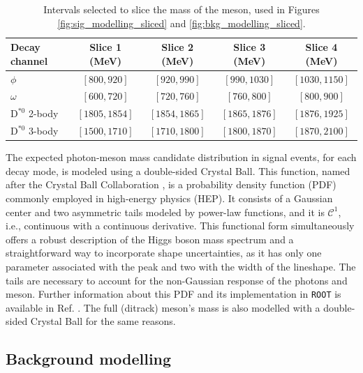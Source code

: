 \begin{table}[!ht]
    \centering
    \begin{tabular}{|l|c|c|c|c|}
        \hline
        \cellcolor{lightgray}Decay channel &\cellcolor{lightgray}Slice 1 (MeV)&\cellcolor{lightgray}Slice 2 (MeV)&\cellcolor{lightgray}Slice 3 (MeV)&\cellcolor{lightgray}Slice 4 (MeV)\\ \hline
        $\phi$                  &$[800, 920]$&$[920, 990]$&$[990, 1030]$&$[1030, 1150]$  \\
        $\omega$                &$[600, 720]$&$[720, 760]$&$[760, 800]$&$[800, 900]$  \\
        $\text{D}^{*0}$ 2-body  &$[1805, 1854]$&$[1854, 1865]$&$[1865, 1876]$&$[1876, 1925]$  \\
        $\text{D}^{*0}$ 3-body  &$[1500, 1710]$&$[1710, 1800]$&$[1800, 1870]$&$[1870, 2100]$  \\
        \hline
        \end{tabular}
    \caption{Intervals selected to slice the mass of the meson, used in Figures \ref{fig:sig_modelling_sliced} and \ref{fig:bkg_modelling_sliced}.}
    \label{tab:slice_values}
\end{table}

The expected photon-meson mass candidate distribution in signal events, for each decay mode, is modeled using a double-sided Crystal Ball. This function, named after the Crystal Ball Collaboration \cite{A2:CB}, is a probability density function (PDF) commonly employed in high-energy physics (HEP). It consists of a Gaussian center and two asymmetric tails modeled by power-law functions, and it is $\mathcal{C}^{1}$, i.e., continuous with a continuous derivative. This functional form simultaneously offers a robust description of the Higgs boson mass spectrum and a straightforward way to incorporate shape uncertainties, as it has only one parameter associated with the peak and two with the width of the lineshape. The tails are necessary to account for the non-Gaussian response of the photons and meson. Further information about this PDF and its implementation in \verb+ROOT+ is available in Ref. \cite{CERN:root_CB}. The full (ditrack) meson's mass is also modelled with a double-sided Crystal Ball for the same reasons.

\subsection{Background modelling}

